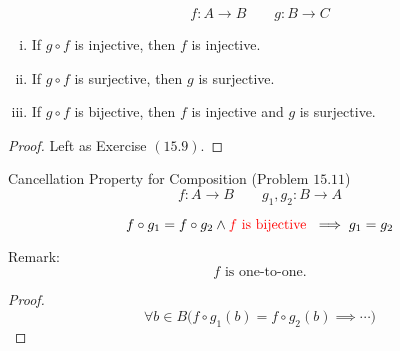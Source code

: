 \begin{frame}{}
  \begin{theorem}
    \[
      f: A \to B \qquad g: B \to C
    \]

    \begin{enumerate}[(i)]
      \item If $g \circ f$ is injective, then $f$ is injective.
      \item If $g \circ f$ is surjective, then $g$ is surjective.
      \item If $g \circ f$ is bijective, then $f$ is injective and $g$ is surjective.
    \end{enumerate}
  \end{theorem}

  \pause
  \vspace{0.60cm}
  \begin{proof}
    \centerline{Left as Exercise $(15.9)$.}
  \end{proof}
\end{frame}

\begin{frame}{}
  \begin{exampleblock}{Cancellation Property for Composition (Problem $15.11$)}
    \[
      f: A \to B \qquad g_1, g_2: B \to A
    \]

    \[
      f \circ g_1 = f \circ g_2 \land \textcolor{red}{f \text{ is bijective }} \implies g_1 = g_2
    \]
  \end{exampleblock}

  \pause
  \vspace{0.60cm}
  \begin{alertblock}{Remark:}
    \[
      f \text{ is one-to-one}.
    \]
  \end{alertblock}

  \pause
  \vspace{0.60cm}
  \begin{proof}
    \pause
    \[
      \forall b \in B \Big( f \circ g_1 (b) = f \circ g_2 (b) \implies \cdots \Big)
    \]
  \end{proof}
\end{frame}
